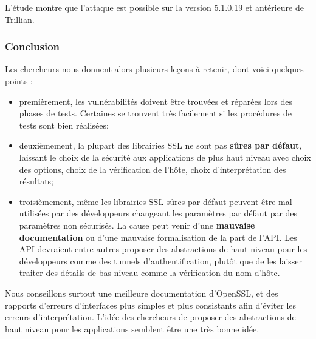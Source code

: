 L'étude montre que l'attaque est possible sur la version 5.1.0.19 et antérieure de Trillian.

\subsubsection{Conclusion}

Les chercheurs nous donnent alors plusieurs leçons à retenir, dont voici quelques points :
\begin{itemize}
\item premièrement, les vulnérabilités doivent être trouvées et réparées lors des phases de tests. Certaines se trouvent très facilement si les procédures de tests sont bien réalisées;
\item deuxièmement, la plupart des librairies SSL ne sont pas \textbf{sûres par défaut}, laissant le choix de la sécurité aux applications de plus haut niveau avec choix des options, choix de la vérification de l'hôte, choix d'interprétation des résultats;
\item troisièmement, même les librairies SSL sûres par défaut peuvent être mal utilisées par des développeurs changeant les paramètres par défaut par des paramètres non sécurisés. La cause peut venir d'une \textbf{mauvaise documentation} ou d'une mauvaise formalisation de la part de l'API. Les API devraient entre autres proposer des abstractions de haut niveau pour les développeurs comme des tunnels d'authentification, plutôt que de les laisser traiter des détails de bas niveau comme la vérification du nom d'hôte.\\
\end{itemize}

Nous conseillons surtout une meilleure documentation d'OpenSSL, et des rapports d'erreurs d'interfaces plus simples et plus consistants afin d'éviter les erreurs d'interprétation. L'idée des chercheurs de proposer des abstractions de haut niveau pour les applications semblent être une très bonne idée.
